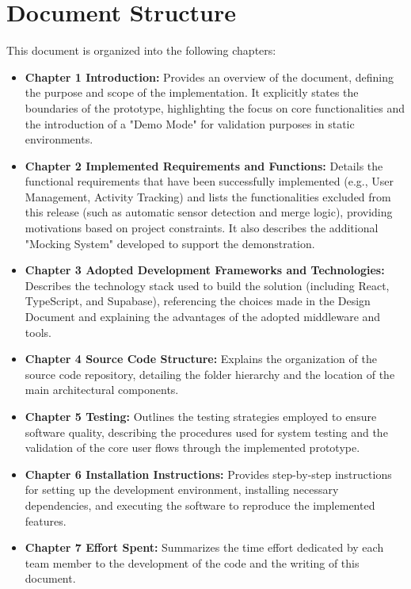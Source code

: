\section{Document Structure}
This document is organized into the following chapters:

\begin{itemize} 
    \item \textbf{Chapter 1 Introduction:}
    Provides an overview of the document, defining the purpose and scope of the implementation. It explicitly states the boundaries of the prototype, highlighting the focus on core functionalities and the introduction of a "Demo Mode" for validation purposes in static environments.

    \item \textbf{Chapter 2 Implemented Requirements and Functions:}
    Details the functional requirements that have been successfully implemented (e.g., User Management, Activity Tracking) and lists the functionalities excluded from this release (such as automatic sensor detection and merge logic), providing motivations based on project constraints. It also describes the additional "Mocking System" developed to support the demonstration.

    \item \textbf{Chapter 3 Adopted Development Frameworks and Technologies:}
    Describes the technology stack used to build the solution (including React, TypeScript, and Supabase), referencing the choices made in the Design Document and explaining the advantages of the adopted middleware and tools.

    \item \textbf{Chapter 4 Source Code Structure:} 
    Explains the organization of the source code repository, detailing the folder hierarchy and the location of the main architectural components.

    \item \textbf{Chapter 5 Testing:} 
    Outlines the testing strategies employed to ensure software quality, describing the procedures used for system testing and the validation of the core user flows through the implemented prototype.

    \item \textbf{Chapter 6 Installation Instructions:} 
    Provides step-by-step instructions for setting up the development environment, installing necessary dependencies, and executing the software to reproduce the implemented features.

    \item \textbf{Chapter 7 Effort Spent:} 
    Summarizes the time effort dedicated by each team member to the development of the code and the writing of this document.
\end{itemize}


